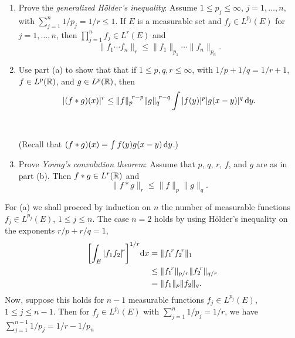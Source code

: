 \begin{problem}
  \hfill
  \begin{enumerate}[label=(\alph*),noitemsep]
  \item Prove the \emph{generalized Hölder's inequality}: Assume
    \(1\leq p_j\leq\infty\), \(j=1,\dotsc,n\), with
    \(\sum_{j=1}^n 1/p_j=1/r\leq 1\). If \(E\) is a measurable set and
    \(f_j\in L^{p_j}(E)\) for \(j=1,\dotsc,n\), then
    \(\prod_{j=1}^n f_j\in L^r(E)\) and
    \[
      \|f_1\dotsm f_n\|_r\leq\|f_1\|_{p_1}\dotsm\|f_n\|_{p_n}.
    \]
  \item Use part (a) to show that that if \(1\leq p,q,r\leq\infty\), with
    \(1/p+1/q=1/r+1\), \(f\in L^p(\mathbb{R})\), and \(g\in L^p(\mathbb{R})\), then
    \[
      |(f*g)(x)|^r\leq{\|f\|_p}^{\!r-p}{\|g\|_q}^{\!r-q}\int|f(y)|^p|g(x-y)|^q\mathop{}\!\mathrm{d}
      y.
    \]
    \\\\
    (Recall that \((f*g)(x)=\int f(y)g(x-y)\mathop{}\!\mathrm{d} y\).)
  \item Prove \emph{Young's convolution theorem}: Assume that \(p\), \(q\),
    \(r\), \(f\), and \(g\) are as in part (b). Then \(f*g\in L^r(\mathbb{R})\)
    and
    \[
      \|f*g\|_r\leq\|f\|_p\|g\|_q.
    \]
  \end{enumerate}
\end{problem}
\begin{solution}
  For (a) we shall proceed by induction on \(n\) the number of measurable
  functions \(f_j\in L^{p_j}(E)\), \(1\leq j\leq n\). The case \(n=2\)
  holds by using Hölder's inequality on the exponents \(r/p+r/q=1\),
  \begin{align*}
    \biggl[\int_E|f_1f_2|^{\!r}\biggr]^{1/r}\mathrm{d} x
    &=\|{f_1}^{\!r}{f_2}^{\!r}\|_1\\
    &\leq\|{f_1}^{\!r}\|_{p/r}\|{f_2}^{\!r}\|_{q/r}\\
    &=\|f_1\|_p\|f_2\|_q.
  \end{align*}
  Now, suppose this holds for \(n-1\) measurable functions
  \(f_j\in L^{p_j}(E)\), \(1\leq j\leq n-1\). Then for
  \(f_j\in L^{p_j}(E)\) with \(\sum_{j=1}^n 1/p_j=1/r\), we have
  \(\sum_{j=1}^{n-1}1/p_j=1/r-1/p_n\)
\end{solution}

